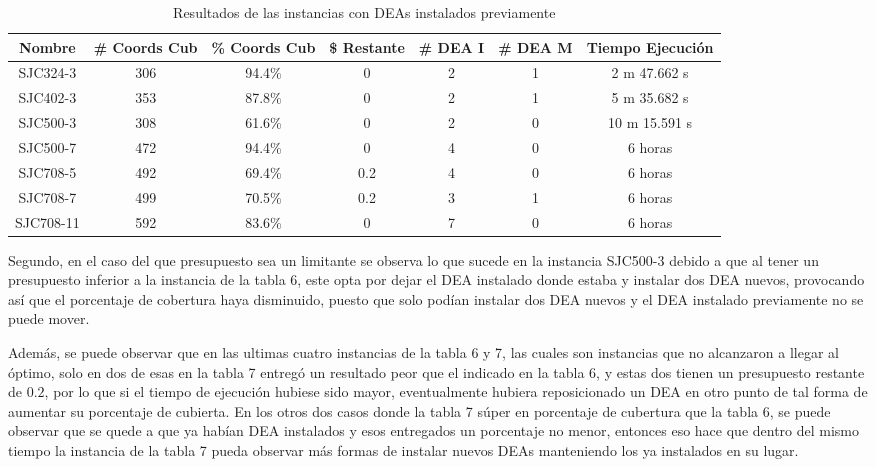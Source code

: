\documentclass[letter, 10pt]{article}
\begin{document}
\begin{table}[h!]
    \hspace{-1.2cm}
    \begin{tabular}{|c|c|c|c|c|c|c|}
    \hline
    Nombre & \# Coords Cub & \% Coords Cub & \$ Restante & \# DEA I  & \# DEA M & Tiempo Ejecuci\'on\\
    \hline
    SJC324-3 & 306 & 94.4\% & 0 & 2 & 1 & 2 m 47.662 s\\
    \hline
    SJC402-3 & 353 & 87.8\% & 0 & 2 & 1 & 5 m 35.682 s\\
    \hline
    SJC500-3 & 308 & 61.6\% & 0 & 2 & 0 & 10 m 15.591 s\\
    \hline
    SJC500-7 & 472 & 94.4\% & 0 & 4 & 0 & 6 horas\\
    \hline
    SJC708-5 & 492 & 69.4\% & 0.2 & 4 & 0 & 6 horas\\
    \hline
    SJC708-7 & 499 & 70.5\% & 0.2 & 3 & 1 & 6 horas\\
    \hline
    SJC708-11 & 592 & 83.6\% & 0 & 7 & 0 & 6 horas\\
    \hline
    
    \end{tabular}
    \caption{Resultados de las instancias con DEAs instalados previamente}
    \label{tab:caract}
\end{table}


Segundo, en el caso del que presupuesto sea un limitante se observa lo que sucede en la instancia SJC500-3 debido a que al tener un presupuesto inferior a la instancia de la tabla 6, este opta por dejar el DEA instalado donde estaba y instalar dos DEA nuevos, provocando as\'i que el porcentaje de cobertura haya disminuido, puesto que solo pod\'ian instalar dos DEA nuevos y el DEA instalado previamente no se puede mover.

Adem\'as, se puede observar que en las ultimas cuatro instancias de la tabla 6 y 7, las cuales son instancias que no alcanzaron a llegar al \'optimo, solo en dos de esas en la tabla 7 entreg\'o un resultado peor que el indicado en la tabla 6, y estas dos tienen un presupuesto restante de $0.2$, por lo que si el tiempo de ejecuci\'on hubiese sido mayor, eventualmente hubiera reposicionado un DEA en otro punto de tal forma de aumentar su porcentaje de cubierta. En los otros dos casos donde la tabla 7 s\'uper en porcentaje de cubertura que la tabla 6, se puede observar que se quede a que ya hab\'ian DEA instalados y esos entregados un porcentaje no menor, entonces eso hace que dentro del mismo tiempo la instancia de la tabla 7 pueda observar m\'as formas de instalar nuevos DEAs manteniendo los ya instalados en su lugar.
\end{document}
